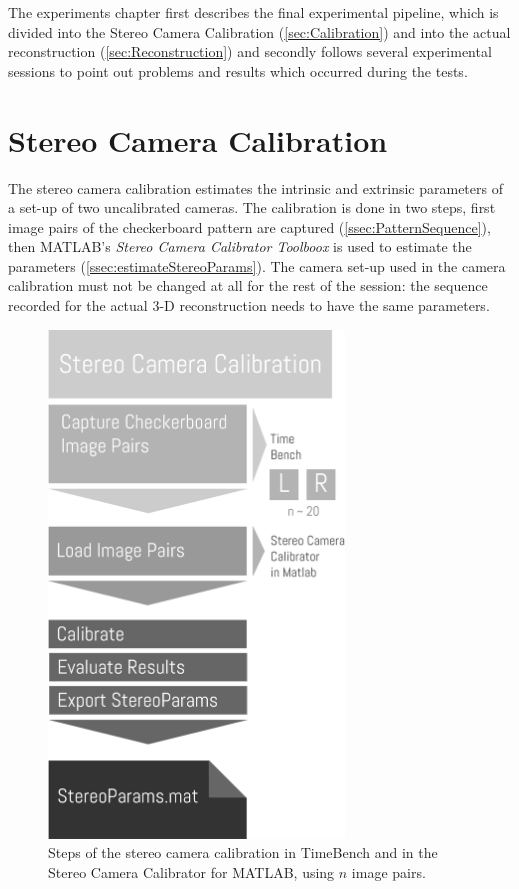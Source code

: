 \label{c:Experiments}
The experiments chapter first describes the final experimental pipeline, which is divided into the Stereo Camera Calibration (\autoref{sec:Calibration}) and into the actual reconstruction (\autoref{sec:Reconstruction}) and secondly follows several experimental sessions to point out problems and results which occurred during the tests.

\section{Stereo Camera Calibration}\label{sec:Calibration}
The stereo camera calibration estimates the intrinsic and extrinsic parameters of a set-up of two uncalibrated cameras. The calibration is done in two steps, first image pairs of the checkerboard pattern are captured (\autoref{ssec:PatternSequence}), then MATLAB's \textit{Stereo Camera Calibrator Toolboox} is used to estimate the parameters (\autoref{ssec:estimateStereoParams}). The camera set-up used in the camera calibration must not be changed at all for the rest of the session: the sequence recorded for the actual 3-D reconstruction needs to have the same parameters.

\begin{figure}[htbp]
		\centering
		\includegraphics[width=0.7\textwidth]{figures/CameraCalibration}
		\caption[Steps of the stereo camera calibration]{Steps of the stereo camera calibration in TimeBench and in the Stereo Camera Calibrator for MATLAB, using $n$ image pairs.}
		\label{fig:stereoCamCalib}
\end{figure} 

